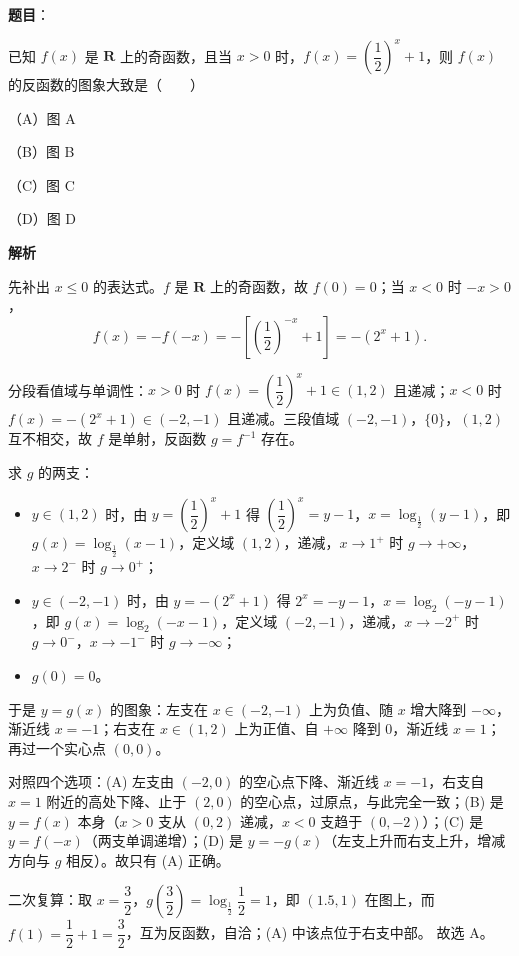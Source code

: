 \begin{answer}

\textbf{题目}：

已知 $f(x)$ 是 $\mathbf R$ 上的奇函数，且当 $x>0$ 时，$f(x)=\left(\dfrac12\right)^x+1$，则 $f(x)$ 的反函数的图象大致是\mbox{（　　）}

（A）图 A

（B）图 B

（C）图 C

（D）图 D
\nopagebreak[4]
\begin{center}\end{center}
\nopagebreak[4]
\textbf{解析}

先补出 $x\leqslant0$ 的表达式。$f$ 是 $\mathbf R$ 上的奇函数，故 $f(0)=0$；当 $x<0$ 时 $-x>0$，
\nopagebreak[4]
\[f(x)=-f(-x)=-\left[\left(\frac12\right)^{-x}+1\right]=-(2^x+1).\]

分段看值域与单调性：$x>0$ 时 $f(x)=\left(\dfrac12\right)^x+1\in(1,2)$ 且递减；$x<0$ 时 $f(x)=-(2^x+1)\in(-2,-1)$ 且递减。三段值域 $(-2,-1)$，$\{0\}$，$(1,2)$ 互不相交，故 $f$ 是单射，反函数 $g=f^{-1}$ 存在。

求 $g$ 的两支：
\begin{itemize}
\item $y\in(1,2)$ 时，由 $y=\left(\dfrac12\right)^x+1$ 得 $\left(\dfrac12\right)^x=y-1$，$x=\log_{\frac12}(y-1)$，即 $g(x)=\log_{\frac12}(x-1)$，定义域 $(1,2)$，递减，$x\to1^+$ 时 $g\to+\infty$，$x\to2^-$ 时 $g\to0^+$；
\item $y\in(-2,-1)$ 时，由 $y=-(2^x+1)$ 得 $2^x=-y-1$，$x=\log_2(-y-1)$，即 $g(x)=\log_2(-x-1)$，定义域 $(-2,-1)$，递减，$x\to-2^+$ 时 $g\to0^-$，$x\to-1^-$ 时 $g\to-\infty$；
\item $g(0)=0$。
\end{itemize}

于是 $y=g(x)$ 的图象：左支在 $x\in(-2,-1)$ 上为负值、随 $x$ 增大降到 $-\infty$，渐近线 $x=-1$；右支在 $x\in(1,2)$ 上为正值、自 $+\infty$ 降到 $0$，渐近线 $x=1$；再过一个实心点 $(0,0)$。

对照四个选项：(A) 左支由 $(-2,0)$ 的空心点下降、渐近线 $x=-1$，右支自 $x=1$ 附近的高处下降、止于 $(2,0)$ 的空心点，过原点，与此完全一致；(B) 是 $y=f(x)$ 本身（$x>0$ 支从 $(0,2)$ 递减，$x<0$ 支趋于 $(0,-2)$）；(C) 是 $y=f(-x)$（两支单调递增）；(D) 是 $y=-g(x)$（左支上升而右支上升，增减方向与 $g$ 相反）。故只有 (A) 正确。

二次复算：取 $x=\dfrac32$，$g\left(\dfrac32\right)=\log_{\frac12}\dfrac12=1$，即 $(1.5,1)$ 在图上，而 $f(1)=\dfrac12+1=\dfrac32$，互为反函数，自洽；(A) 中该点位于右支中部。
故选 A。


\end{answer}
